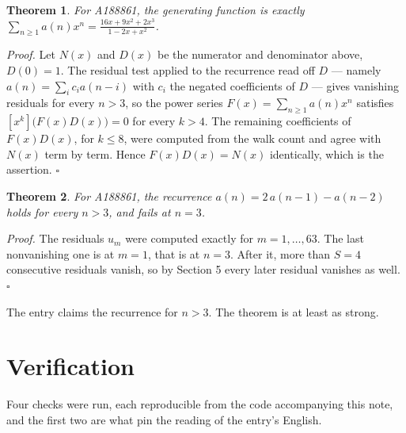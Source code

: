 \documentclass[11pt]{article}
\newtheorem{theorem}{Theorem}
\theoremstyle{definition}
\begin{document}
\begin{theorem} For A188861, the generating function is exactly $\sum_{n\ge 1} a(n)x^n = \frac{16x + 9x^{2} + 2x^{3}}{1 - 2x + x^{2}}$.\end{theorem}

{\itshape Proof.} Let $N(x)$ and $D(x)$ be the numerator and denominator above, $D(0)=1$. The residual test applied to the recurrence read off $D$ --- namely $a(n) = \sum_i c_i a(n-i)$ with $c_i$ the negated coefficients of $D$ --- gives vanishing residuals for every $n > 3$, so the power series $F(x)=\sum_{n\ge 1}a(n)x^n$ satisfies $[x^k]\bigl(F(x)D(x)\bigr) = 0$ for every $k > 4$. The remaining coefficients of $F(x)D(x)$, for $k \le 8$, were computed from the walk count and agree with $N(x)$ term by term. Hence $F(x)D(x) = N(x)$ identically, which is the assertion. $\square$

\begin{theorem} For A188861, the recurrence $a(n) = 2\,a(n-1) - a(n-2)$ holds for every $n > 3$, and fails at $n = 3$.\end{theorem}

{\itshape Proof.} The residuals $u_m$ were computed exactly for $m = 1,\dots,63$. The last nonvanishing one is at $m = 1$, that is at $n = 3$. After it, more than $S = 4$ consecutive residuals vanish, so by Section 5 every later residual vanishes as well. $\square$

The entry claims the recurrence for $n > 3$. The theorem is at least as strong.

\section{Verification}

Four checks were run, each reproducible from the code accompanying this note, and the first two are what pin the reading of the entry's English.
\end{document}
